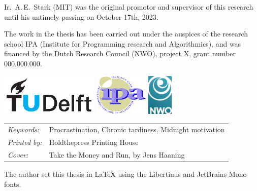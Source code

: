\begin{titlepage}
\medskip
\medskip

\noindent Ir.\ A.\,E.\ Stark (MIT) was the original promotor and supervisor of this research until his untimely passing on October 17th, 2023.
\medskip

\noindent The work in the thesis has been carried out under the auspices of the research school IPA
(Institute for Programming research and Algorithmics), and was financed by the Dutch Research Council (NWO), project X, grant number 000.000.000.

\medskip
\vfill
\begin{center}
  \includegraphics[trim={0.2cm 0.8cm 0.3cm 0.3cm},clip,height=2.0cm]{000-title/TUDelft_logo_cmyk}
  \hspace{2em}
  \includegraphics[height=2.0cm]{000-title/ipa}
  \hspace{2em}
  \includegraphics[height=2.0cm]{000-title/NWO logo - full colour - CMYK}
\end{center}
\vfill

\noindent
\begin{tabular}{@{}p{}@{}p{}}
  \textit{Keywords:} & Procrastination, Chronic tardiness, Midnight motivation \\[\medskipamount]
  \textit{Printed by:} & Holdthepress Printing House \\[\medskipamount]
  \textit{Cover:} & Take the Money and Run, by Jens Haaning \\[\medskipamount]
\end{tabular}

\medskip
\medskip

\noindent The author set this thesis in \LaTeX\xspace using the Libertinus and JetBrains Mono fonts.


\end{titlepage}
